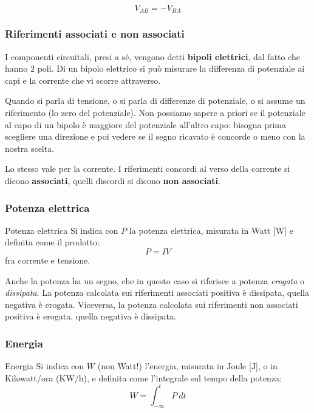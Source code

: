 \documentclass[a4paper,14pt]{memoir}
\begin{document}
$$
V_{AB} = -V_{BA}
$$

\subsubsection{Riferimenti associati e non associati}
I componenti circuitali, presi a sé, vengono detti \textbf{bipoli elettrici}, dal fatto che hanno 2 poli.
Di un bipolo elettrico si può misurare la differenza di potenziale ai capi e la corrente che vi scorre attraverso.

Quando si parla di tensione, o si parla di differenze di potenziale, o si assume un riferimento (lo zero del potenziale).
Non possiamo sapere a priori se il potenziale al capo di un bipolo è maggiore del potenziale all'altro capo: bisogna prima scegliere una direzione e poi vedere se il segno ricavato è concorde o meno con la nostra scelta.

Lo stesso vale per la corrente.
I riferimenti concordi al verso della corrente si dicono \textbf{associati}, quelli discordi si dicono \textbf{non associati}.

\subsubsection{Potenza elettrica}

\begin{definition}{Potenza elettrica}
Si indica con $P$ la potenza elettrica, misurata in Watt [$\mathrm{W}$] e definita come il prodotto:
$$
	P = IV
$$
fra corrente e tensione.
\end{definition}

Anche la potenza ha un segno, che in questo caso si riferisce a potenza \textit{erogata} o \textit{dissipata}.
La potenza calcolata sui riferimenti associati positiva è dissipata, quella negativa è erogata.
Viceversa, la potenza calcolata sui riferimenti non associati positiva è erogata, quella negativa è dissipata.

\subsubsection{Energia}

\begin{definition}{Energia}
Si indica con $W$ (non Watt!) l'energia, misurata in Joule [$\mathrm{J}$], o in Kilowatt/ora ($\mathrm{KW/h}$), e definita come l'integrale sul tempo della potenza:
$$
W = \int_{-\infty}^t P \ dt 
$$
\end{definition}
\end{document}
